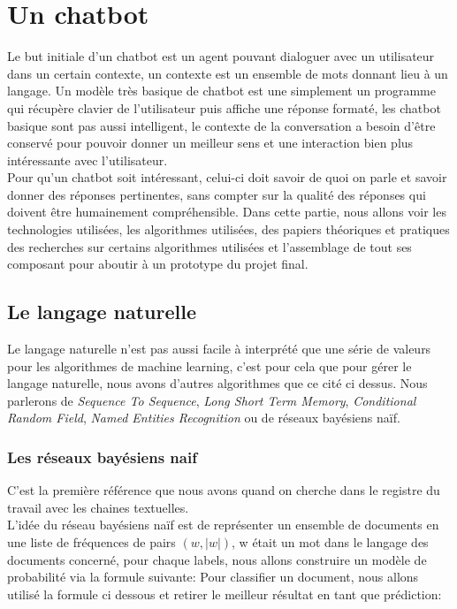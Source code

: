 
\part{Un chatbot}

Le but initiale d'un chatbot est un agent pouvant dialoguer avec un utilisateur dans un certain contexte, un contexte est un ensemble de mots donnant lieu à un langage.\linebreak
Un modèle très basique de chatbot est une simplement un programme qui récupère clavier de l'utilisateur puis affiche une réponse formaté, les chatbot basique sont pas aussi intelligent, le contexte de la conversation a besoin d'être conservé pour pouvoir donner un meilleur sens et une interaction bien plus intéressante avec l'utilisateur.\linebreak
\\
Pour qu'un chatbot soit intéressant, celui-ci doit savoir de quoi on parle et savoir donner des réponses pertinentes, sans compter sur la qualité des réponses qui doivent être humainement compréhensible.\linebreak
\linebreak
Dans cette partie, nous allons voir les technologies utilisées, les algorithmes utilisées, des papiers théoriques et pratiques des recherches sur certains algorithmes utilisées et l'assemblage de tout ses composant pour aboutir à un prototype du projet final.

\chapter{Le langage naturelle}

Le langage naturelle n'est pas aussi facile à interprété que une série de valeurs pour les algorithmes de machine learning, c'est pour cela que pour gérer le langage naturelle, nous avons d'autres algorithmes que ce cité ci dessus.
Nous parlerons de \textit{Sequence To Sequence}, \textit{Long Short Term Memory},  \textit{Conditional Random Field}, \textit{Named Entities Recognition} ou de réseaux bayésiens naïf.\\

\pagebreak
\section{Les réseaux bayésiens naif}

C'est la première référence que nous avons quand on cherche dans le registre du travail avec les chaines textuelles.\\
L'idée du réseau bayésiens naïf est de représenter un ensemble de documents en une liste de fréquences de pairs $(w, |w|)$, w était un mot dans le langage des documents concerné, pour chaque labels, nous allons construire un modèle de probabilité via la formule suivante:
Pour classifier un document, nous allons utilisé la formule ci dessous et retirer le meilleur résultat en tant que prédiction:

